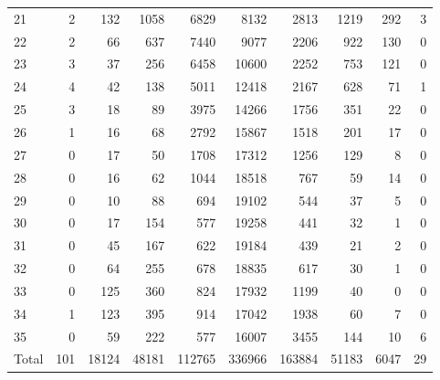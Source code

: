 \begin{table}
\begin{tabular}{lrrrrrrrrr}
21 & 2 & 132 & 1058 & 6829 & 8132 & 2813 & 1219 & 292 & 3 \\
22 & 2 & 66 & 637 & 7440 & 9077 & 2206 & 922 & 130 & 0 \\
23 & 3 & 37 & 256 & 6458 & 10600 & 2252 & 753 & 121 & 0 \\
24 & 4 & 42 & 138 & 5011 & 12418 & 2167 & 628 & 71 & 1 \\
25 & 3 & 18 & 89 & 3975 & 14266 & 1756 & 351 & 22 & 0 \\
26 & 1 & 16 & 68 & 2792 & 15867 & 1518 & 201 & 17 & 0 \\
27 & 0 & 17 & 50 & 1708 & 17312 & 1256 & 129 & 8 & 0 \\
28 & 0 & 16 & 62 & 1044 & 18518 & 767 & 59 & 14 & 0 \\
29 & 0 & 10 & 88 & 694 & 19102 & 544 & 37 & 5 & 0 \\
30 & 0 & 17 & 154 & 577 & 19258 & 441 & 32 & 1 & 0 \\
31 & 0 & 45 & 167 & 622 & 19184 & 439 & 21 & 2 & 0 \\
32 & 0 & 64 & 255 & 678 & 18835 & 617 & 30 & 1 & 0 \\
33 & 0 & 125 & 360 & 824 & 17932 & 1199 & 40 & 0 & 0 \\
34 & 1 & 123 & 395 & 914 & 17042 & 1938 & 60 & 7 & 0 \\
35 & 0 & 59 & 222 & 577 & 16007 & 3455 & 144 & 10 & 6 \\
Total & 101 & 18124 & 48181 & 112765 & 336966 & 163884 & 51183 & 6047 & 29 \\
\end{tabular}
\end{table}
